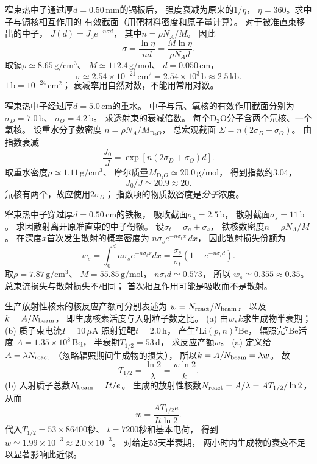 窄束热中子通过厚$d=0.50\,\mathrm{mm}$的镉板后，
强度衰减为原来的$1/\eta$，
$\eta=360$。求中子与镉核相互作用的
有效截面（用靶材料密度和原子量计算）。
\exsolution
对于被准直束移出的中子，
$J(d)=J_0e^{-n\sigma d}$，
其中$n=\rho N_A/M$。
因此
\[
 \boxed{\sigma=\frac{\ln\eta}{nd}
 =\frac{M\ln\eta}{\rho N_A d}}.
\]
取镉$\rho\simeq8.65\,\mathrm{g/cm^3}$、
$M\simeq112.4\,\mathrm{g/mol}$、
$d=0.050\,\mathrm{cm}$，
\[
 \boxed{\sigma\simeq2.54\times10^{-21}\,\mathrm{cm^2}
 =2.54\times10^3\,\mathrm b\approx2.5\,\mathrm{kb}}.
\]
\excheck $1\,\mathrm b=10^{-24}\,\mathrm{cm^2}$；
衰减率用自然对数，不能用常用对数。

窄束热中子经过厚$d=5.0\,\mathrm{cm}$的重水。
中子与氘、氧核的有效作用截面分别为
$\sigma_D=7.0\,\mathrm b$、
$\sigma_O=4.2\,\mathrm b$。
求透射束的衰减倍数。
\exsolution
每个$\mathrm D_2\mathrm O$分子含两个氘核、一个氧核。
设重水分子数密度
$n=\rho N_A/M_{\mathrm D_2O}$，
总宏观截面
$\Sigma=n(2\sigma_D+\sigma_O)$。
由指数衰减
\[
 \boxed{\frac{J_0}{J}=
 \exp[n(2\sigma_D+\sigma_O)d]}.
\]
取重水密度$\rho\simeq1.11\,\mathrm{g/cm^3}$、
摩尔质量$M_{\mathrm D_2O}\simeq20.0\,\mathrm{g/mol}$，
得到指数约$3.04$，
\[
 \boxed{J_0/J\simeq20.9\approx20}.
\]
\excheck 氘核有两个，故应使用$2\sigma_D$；
指数项的物质数密度是\emph{分子}浓度。

窄束热中子穿过厚$d=0.50\,\mathrm{cm}$的铁板，
吸收截面$\sigma_a=2.5\,\mathrm b$，
散射截面$\sigma_s=11\,\mathrm b$。
求因散射离开原准直束的中子份额。
\exsolution
设$\sigma_t=\sigma_a+\sigma_s$，
铁核数密度$n=\rho N_A/M$。
在深度$x$首次发生散射的概率密度为
$n\sigma_se^{-n\sigma_tx}\,dx$，
因此散射损失份额为
\[
 w_s=\int_0^d n\sigma_se^{-n\sigma_tx}dx
 =\boxed{\frac{\sigma_s}{\sigma_t}
 \left(1-e^{-n\sigma_t d}\right)}.
\]
取$\rho=7.87\,\mathrm{g/cm^3}$、
$M=55.85\,\mathrm{g/mol}$，
$n\sigma_td\simeq0.573$，
所以
$\boxed{w_s\simeq0.355\approx0.35}$。
\excheck 总束流损失与散射损失不相同；
首次相互作用可能是吸收而不是散射。

生产放射性核素的核反应产额可分别表述为
$w=N_{\rm react}/N_{\rm beam}$，
以及$k=A/N_{\rm beam}$，
即生成核素活度与入射粒子数之比。
(a) 由$w,k$求生成物半衰期；
(b) 质子束电流$I=10\,\mu\mathrm A$
照射锂靶$t=2.0\,\mathrm h$，
产生$^{7}\mathrm{Li}(p,n){}^{7}\mathrm{Be}$，
辐照完$^{7}\mathrm{Be}$活度
$A=1.35\times10^8\,\mathrm{Bq}$，
半衰期$T_{1/2}=53\,\mathrm d$，
求反应产额$w$。
\exsolution
(a) 定义给$A=\lambda N_{\rm react}$
（忽略辐照期间生成物的损失），
所以$k=A/N_{\rm beam}=\lambda w$。
故
\[
 \boxed{T_{1/2}=\frac{\ln2}{\lambda}
 =\frac{w\ln2}{k}}.
\]
(b) 入射质子总数$N_{\rm beam}=It/e$。
生成的放射性核数$N_{\rm react}=A/\lambda=AT_{1/2}/\ln2$，
从而
\[
 \boxed{w=
 \frac{AT_{1/2}e}{It\ln2}}.
\]
代入$T_{1/2}=53\times86400$秒、
$t=7200$秒和基本电荷，
得到
$\boxed{w\simeq1.99\times10^{-3}\approx2.0\times10^{-3}}$。
\excheck 对给定$53$天半衰期，
两小时内生成物的衰变不足以显著影响此近似。

